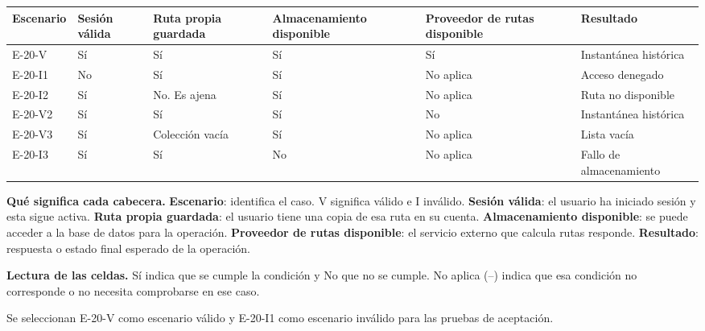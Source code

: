 \begingroup\fontsize{7.8}{11}\selectfont\setlength{\tabcolsep}{3pt}
\begin{tabularx}{\linewidth}{@{}*{6}{Y}@{}}\toprule
\textbf{Escenario} & \textbf{Sesión válida} & \textbf{Ruta propia guardada} & \textbf{Almacenamiento disponible} & \textbf{Proveedor de rutas disponible} & \textbf{Resultado}\\\midrule
E-20-V & Sí & Sí & Sí & Sí & Instantánea histórica\\[3pt]
E-20-I1 & No & Sí & Sí & No aplica & Acceso denegado\\[3pt]
E-20-I2 & Sí & No. Es ajena & Sí & No aplica & Ruta no disponible\\[3pt]
E-20-V2 & Sí & Sí & Sí & No & Instantánea histórica\\[3pt]
E-20-V3 & Sí & Colección vacía & Sí & No aplica & Lista vacía\\[3pt]
E-20-I3 & Sí & Sí & No & No aplica & Fallo de almacenamiento\\[3pt]
\bottomrule\end{tabularx}\endgroup\par
{\fontsize{9}{11}\selectfont\textbf{Qué significa cada cabecera.} \textbf{Escenario}: identifica el caso. V significa válido e I inválido. \textbf{Sesión válida}: el usuario ha iniciado sesión y esta sigue activa. \textbf{Ruta propia guardada}: el usuario tiene una copia de esa ruta en su cuenta. \textbf{Almacenamiento disponible}: se puede acceder a la base de datos para la operación. \textbf{Proveedor de rutas disponible}: el servicio externo que calcula rutas responde. \textbf{Resultado}: respuesta o estado final esperado de la operación.\par\textbf{Lectura de las celdas.} Sí indica que se cumple la condición y No que no se cumple. No aplica (--) indica que esa condición no corresponde o no necesita comprobarse en ese caso.\par}


Se seleccionan E-20-V como escenario válido y E-20-I1 como escenario inválido para las pruebas de aceptación.\par


